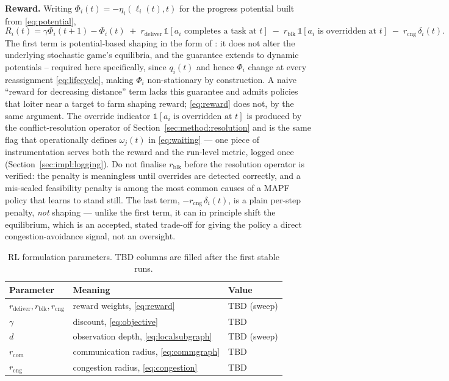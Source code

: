 \documentclass[../main.tex]{subfiles}
\begin{document}
\textbf{Reward.} Writing $\Phi_i(t) = -\eta_i(\ell_i(t),t)$ for the
progress potential built from \eqref{eq:potential},
\begin{equation}
  R_i(t) = \gamma\Phi_i(t+1) - \Phi_i(t)
           \;+\; r_{\mathrm{deliver}}\,\mathbb{1}[a_i \text{ completes a task at } t]
           \;-\; r_{\mathrm{blk}}\,\mathbb{1}[a_i \text{ is overridden at } t]
           \;-\; r_{\mathrm{cng}}\,\delta_i(t) .
  \label{eq:reward}
\end{equation}
The first term is potential-based shaping in the form of
\citet{ng1999policy}: it does not alter the underlying stochastic game's
equilibria, and the guarantee extends to dynamic potentials
\citep{devlin2012dynamic} -- required here specifically, since $q_i(t)$ and
hence $\Phi_i$ change at every reassignment \eqref{eq:lifecycle}, making
$\Phi_i$ non-stationary by construction. A naive ``reward for decreasing
distance'' term lacks this guarantee and admits policies that loiter near a
target to farm shaping reward; \eqref{eq:reward} does not, by the same
argument. The override indicator $\mathbb{1}[a_i \text{ is overridden at }
t]$ is produced by the conflict-resolution operator of
Section~\ref{sec:method:resolution} and is the same flag that operationally
defines $\omega_j(t)$ in \eqref{eq:waiting} --- one piece of instrumentation
serves both the reward and the run-level metric, logged once
(Section~\ref{sec:impl:logging}). Do not finalise $r_{\mathrm{blk}}$ before
the resolution operator is verified: the penalty is meaningless until
overrides are detected correctly, and a mis-scaled feasibility penalty is
among the most common causes of a MAPF policy that learns to stand still.
The last term, $-r_{\mathrm{cng}}\,\delta_i(t)$, is a plain per-step penalty,
\emph{not} shaping --- unlike the first term, it can in principle shift the
equilibrium, which is an accepted, stated trade-off for giving the policy a
direct congestion-avoidance signal, not an oversight.

\begin{table}[h]
  \centering
  \caption{RL formulation parameters. TBD columns are filled after the first
  stable runs.}
  \label{tab:rlparams}
  \begin{tabular}{lll}
    \toprule
    Parameter & Meaning & Value \\
    \midrule
    $r_{\mathrm{deliver}}, r_{\mathrm{blk}}, r_{\mathrm{cng}}$ & reward weights, \eqref{eq:reward} & TBD (sweep) \\
    $\gamma$ & discount, \eqref{eq:objective} & TBD \\
    $d$ & observation depth, \eqref{eq:localsubgraph} & TBD (sweep) \\
    $r_{\mathrm{com}}$ & communication radius, \eqref{eq:commgraph} & TBD \\
    $r_{\mathrm{cng}}$ & congestion radius, \eqref{eq:congestion} & TBD \\
    \bottomrule
  \end{tabular}
\end{table}
\end{document}
